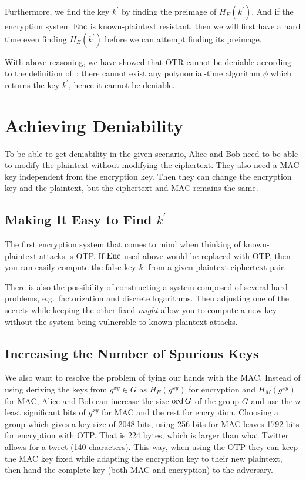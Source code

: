 Furthermore, we find the key \(k^\prime\) by finding the preimage of \(H_E( 
k^\prime )\).
And if the encryption system \(\operatorname{\mathrm{Enc}}\) is known-plaintext resistant, then we 
will first have a hard time even finding \(H_E( k^\prime )\) before we can 
attempt finding its preimage.

With above reasoning, we have showed that \ac{OTR} cannot be deniable according 
to the definition of~\cite{deniablecrypt}: there cannot exist any 
polynomial-time algorithm \(\phi\) which returns the key \(k^\prime\), hence it 
cannot be deniable.


\section{Achieving Deniability}

To be able to get deniability in the given scenario, Alice and Bob need to be 
able to modify the plaintext without modifying the ciphertext.
They also need a \ac{MAC} key independent from the encryption key.
Then they can change the encryption key and the plaintext, but the ciphertext 
and \ac{MAC} remains the same.

\subsection{Making It Easy to Find \(k^\prime\)}

The first encryption system that comes to mind when thinking of known-plaintext 
attacks is \ac{OTP}.
If \(\operatorname{\mathrm{Enc}}\) used above would be replaced with \ac{OTP}, then you can easily 
compute the false key \(k^\prime\) from a given plaintext-ciphertext pair.

There is also the possibility of constructing a system composed of several hard 
problems, e.g.~factorization and discrete logarithms.
Then adjusting one of the secrets while keeping the other fixed \emph{might} 
allow you to compute a new key without the system being vulnerable to 
known-plaintext attacks.

\subsection{Increasing the Number of Spurious Keys}

We also want to resolve the problem of tying our hands with the \ac{MAC}.
Instead of using deriving the keys from \(g^{xy}\in G\) as \(H_E(g^{xy})\) for 
encryption and \(H_M(g^{xy})\) for \ac{MAC}, Alice and Bob can increase the 
size \(\operatorname{ord} G\) of the group \(G\) and use the \(n\) least significant bits of 
\(g^{xy}\) for \ac{MAC} and the rest for encryption.
Choosing a group which gives a key-size of 2048 bits, using 256 bits for 
\ac{MAC} leaves 1792 bits for encryption with \ac{OTP}.
That is 224 bytes, which is larger than what Twitter allows for a tweet (140 
characters).
This way, when using the \ac{OTP} they can keep the \ac{MAC} key fixed while 
adapting the encryption key to their new plaintext, then hand the complete key 
(both \ac{MAC} and encryption) to the adversary.

